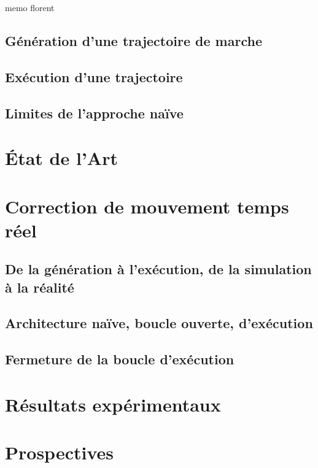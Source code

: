 memo florent

\subsection{Génération d'une trajectoire de marche}
\subsection{Exécution d'une trajectoire}
\subsection{Limites de l'approche naïve}

\section{État de l'Art}

\section{Correction de mouvement temps réel}
\subsection{De la génération à l'exécution, de la simulation à la réalité}
\subsection{Architecture naïve, boucle ouverte, d'exécution}
\subsection{Fermeture de la boucle d'exécution}

\section{Résultats expérimentaux}

\section{Prospectives}
